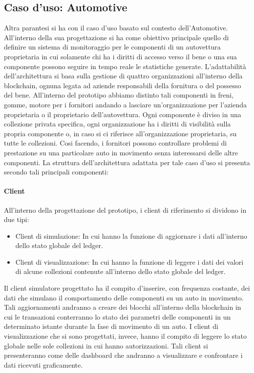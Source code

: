 \subsection{Caso d'uso: Automotive}
Altra parantesi si ha con il caso d'uso basato sul contesto dell'Automotive. All'interno della sua progettazione si ha come obiettivo principale quello di definire un sistema di monitoraggio per le componenti di un autovettura proprietaria in cui solamente chi ha i diritti di accesso verso il bene o una sua componente possono seguire in tempo reale le statistiche generate. L'adattabilità dell'architettura si basa sulla gestione di quattro organizzazioni all'interno della blockchain, ognuna legata ad aziende responsabili della fornitura o del possesso del bene. All'interno del prototipo abbiamo distinto tali componenti in freni, gomme, motore per i fornitori andando a lasciare un'organizzazione per l'azienda proprietaria o il proprietario dell'autovettura. Ogni componente è diviso in una collezione privata specifica, ogni organizzazione ha i diritti di visibilità sulla propria componente o, in caso si ci riferisce all'organizzazione proprietaria, su tutte le collezioni. Cosi facendo, i fornitori possono controllare problemi di prestazione su una particolare auto in movimento senza interessarsi delle altre componenti.
La struttura dell'architettura adattata per tale caso d'uso si presenta secondo tali principali componenti:
\paragraph{Client} 
All'interno della progettazione del prototipo, i client di riferimento si dividono in due tipi: 
\begin{itemize}
    \item Client di simulazione: In cui hanno la funzione di aggiornare i dati all'interno dello stato globale del ledger.
    \item Client di visualizzazione: In cui hanno la funzione di leggere i dati dei valori di alcune collezioni contenute all'interno dello stato globale del ledger. 
\end{itemize}
Il client simulatore progettato ha il compito d'inserire, con frequenza costante, dei dati che simulano il comportamento delle componenti su un auto in movimento. Tali aggiornamenti andranno a creare dei blocchi all'interno della blockchain in cui le transazioni conterranno lo stato dei parametri delle componenti in un determinato istante durante la fase di movimento di un auto. I client di visualizzazione che si sono progettati, invece, hanno il compito di leggere lo stato globale nelle sole collezioni in cui hanno autorizzazioni. Tali client si presenteranno come delle dashboard che andranno a visualizzare e confrontare i dati ricevuti graficamente.
